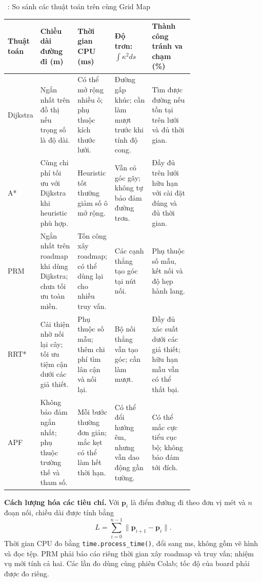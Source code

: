 \begin{center}
\begingroup
\singlespacing
\fontsize{11}{13.2}\selectfont
\setlength{\tabcolsep}{4pt}
\renewcommand{\arraystretch}{1.16}
\label{tab:so-sanh-nam-thuat-toan}
\tablename~\thetable: So sánh các thuật toán trên cùng Grid Map\par\smallskip
\begin{tabular}{@{}>{\raggedright\arraybackslash}p{0.10\linewidth}
  >{\raggedright\arraybackslash}p{0.205\linewidth}
  >{\raggedright\arraybackslash}p{0.205\linewidth}
  >{\raggedright\arraybackslash}p{0.205\linewidth}
  >{\raggedright\arraybackslash}p{}@{}}
\toprule
\textbf{Thuật toán} & \textbf{Chiều dài đường đi (m)} & \textbf{Thời gian CPU (ms)} & \textbf{Độ trơn: \(\int\kappa^2ds\)} & \textbf{Thành công tránh va chạm (\%)}\\
\midrule
Dijkstra & Ngắn nhất trên đồ thị nếu trọng số là độ dài. & Có thể mở rộng nhiều ô; phụ thuộc kích thước lưới. & Đường gấp khúc; cần làm mượt trước khi tính độ cong. & Tìm được đường nếu tồn tại trên lưới và đủ thời gian.\\
\midrule
A* & Cùng chi phí tối ưu với Dijkstra khi heuristic phù hợp. & Heuristic tốt thường giảm số ô mở rộng. & Vẫn có góc gãy; không tự bảo đảm đường trơn. & Đầy đủ trên lưới hữu hạn với cài đặt đúng và đủ thời gian.\\
\midrule
PRM & Ngắn nhất trên roadmap khi dùng Dijkstra; chưa tối ưu toàn miền. & Tốn công xây roadmap; có thể dùng lại cho nhiều truy vấn. & Các cạnh thẳng tạo góc tại nút nối. & Phụ thuộc số mẫu, kết nối và độ hẹp hành lang.\\
\midrule
RRT* & Cải thiện nhờ nối lại cây; tối ưu tiệm cận dưới các giả thiết. & Phụ thuộc số mẫu; thêm chi phí tìm lân cận và nối lại. & Bộ nối thẳng vẫn tạo góc; cần làm mượt. & Đầy đủ xác suất dưới các giả thiết; hữu hạn mẫu vẫn có thể thất bại.\\
\midrule
APF & Không bảo đảm ngắn nhất; phụ thuộc trường thế và tham số. & Mỗi bước thường đơn giản; mắc kẹt có thể làm hết thời hạn. & Có thể đổi hướng êm, nhưng vẫn dao động gần tường. & Có thể mắc cực tiểu cục bộ; không bảo đảm tới đích.\\
\bottomrule
\end{tabular}
\endgroup
\end{center}

\noindent\textbf{Cách lượng hóa các tiêu chí.} Với \(\mathbf p_i\) là điểm đường đi theo đơn vị mét và \(n\) đoạn nối, chiều dài được tính bằng
\[
L=\sum_{i=0}^{n-1}\|\mathbf p_{i+1}-\mathbf p_i\|.
\]
Thời gian CPU đo bằng \texttt{time.process\_time()}, đổi sang ms, không gồm vẽ hình và đọc tệp. PRM phải báo cáo riêng thời gian xây roadmap và truy vấn; nhiệm vụ mới tính cả hai. Các lần đo dùng cùng phiên Colab; tốc độ của board phải được đo riêng.

